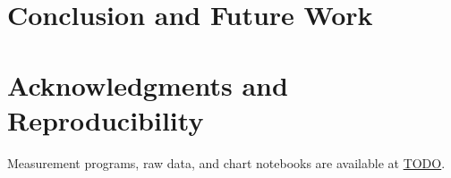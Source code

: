 \chapter{Conclusion and Future Work}
\label{sec:summary}

\chapter*{Acknowledgments and Reproducibility}
Measurement programs, raw data, and chart notebooks are available at \url{TODO}.
